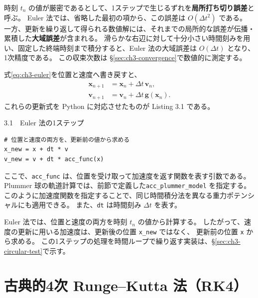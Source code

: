 時刻 $t_n$ の値が厳密であるとして、1ステップで生じるずれを\textbf{局所打ち切り誤差}と呼ぶ。
Euler 法では、省略した最初の項から、この誤差は $O(\Delta t^2)$ である。
一方、更新を繰り返して得られる数値解には、それまでの局所的な誤差が伝播・累積した\textbf{大域誤差}が含まれる。
滑らかな右辺に対して十分小さい時間刻みを用い、固定した終端時刻まで積分すると、Euler 法の大域誤差は $O(\Delta t)$ となり、1次精度である\cite{kouya2021}。
この収束次数は §\ref{sec:ch3-convergence}で数値的に測定する。

式\eqref{eq:ch3-euler}を位置と速度へ書き戻すと、
\begin{align}
 \boldsymbol{x}_{n+1}&=\boldsymbol{x}_n+\Delta t\,\boldsymbol{v}_n,\label{eq:ch3-euler-x}\\
 \boldsymbol{v}_{n+1}&=\boldsymbol{v}_n+\Delta t\,\boldsymbol{g}(\boldsymbol{x}_n).\label{eq:ch3-euler-v}
\end{align}
これらの更新式を Python に対応させたものが Listing 3.1 である。
\begin{listingbox}{3.1　Euler 法の1ステップ}
\begin{Verbatim}[fontsize=\small]
# 位置と速度の両方を、更新前の値から求める
x_new = x + dt * v
v_new = v + dt * acc_func(x)
\end{Verbatim}
\end{listingbox}
ここで、\texttt{acc\_func} は、位置を受け取って加速度を返す関数を表す引数である。
Plummer 球の軌道計算では、前節で定義した\texttt{acc\_plummer\_model} を指定する。
このように加速度関数を指定することで、同じ時間積分法を異なる重力ポテンシャルにも適用できる。
また、\texttt{dt} は時間刻み $\Delta t$ を表す。

Euler 法では、位置と速度の両方を時刻 $t_n$ の値から計算する。
したがって、速度の更新に用いる加速度は、更新後の位置 \texttt{x\_new} ではなく、
更新前の位置 \texttt{x} から求める。
この1ステップの処理を時間ループで繰り返す実装は、§\ref{sec:ch3-circular-test}で示す。

\section{古典的4次 Runge--Kutta 法（RK4）}
\label{sec:ch3-rk4}

